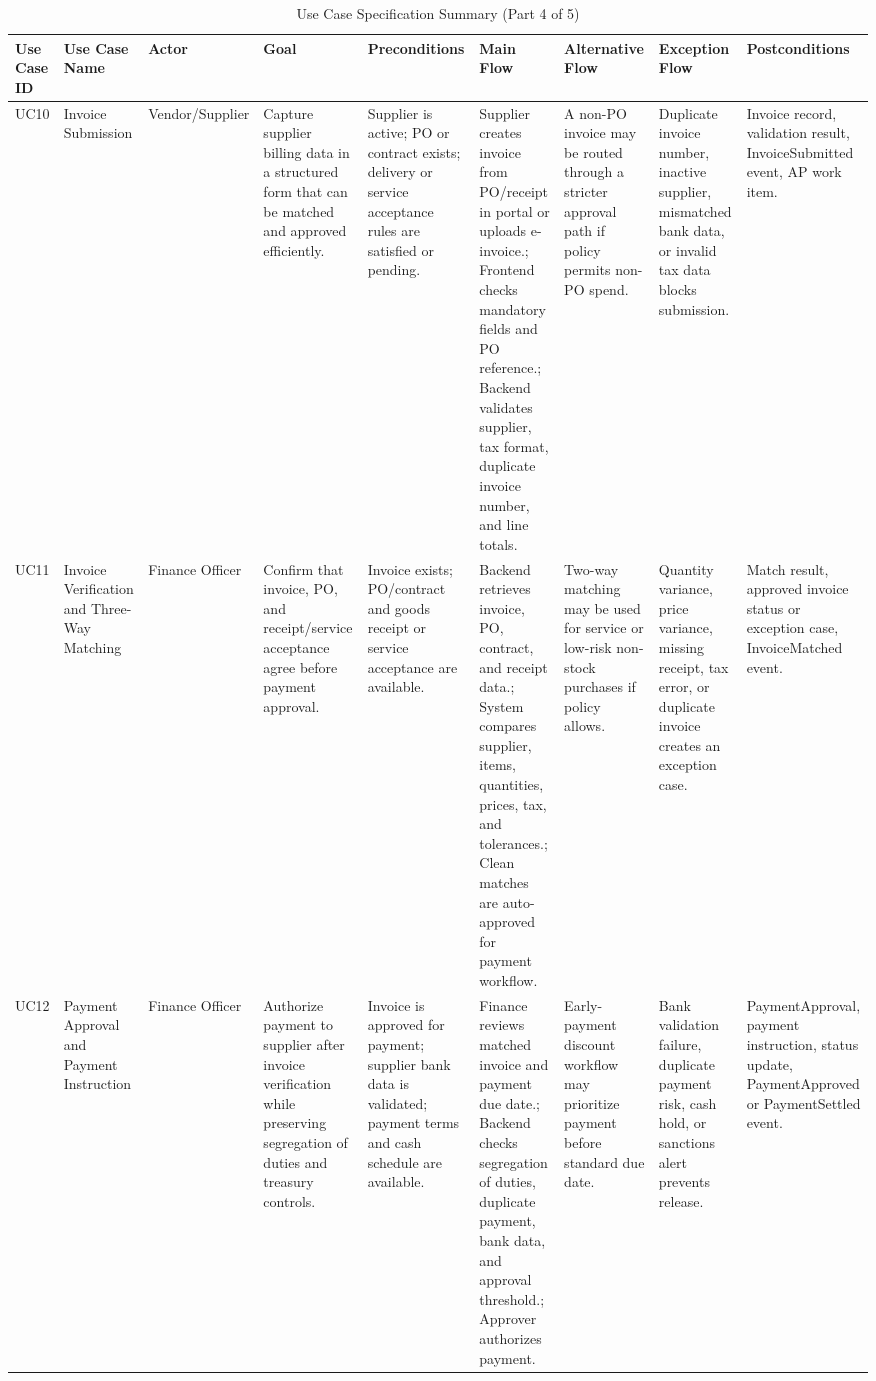 \documentclass[conference]{IEEEtran}
\begin{document}
\begin{table}[!t]
\caption{Use Case Specification Summary (Part 4 of 5)}
\label{tab:usecases-4}
\tiny
\begin{tabularx}{\textwidth}{|L{0.75cm}|L{1.8cm}|L{1.6cm}|Y|Y|Y|Y|Y|Y|}
\hline
\textbf{Use Case ID} & \textbf{Use Case Name} & \textbf{Actor} & \textbf{Goal} & \textbf{Preconditions} & \textbf{Main Flow} & \textbf{Alternative Flow} & \textbf{Exception Flow} & \textbf{Postconditions} \\ \hline
UC10 & Invoice Submission & Vendor/Supplier & Capture supplier billing data in a structured form that can be matched and approved efficiently. & Supplier is active; PO or contract exists; delivery or service acceptance rules are satisfied or pending. & Supplier creates invoice from PO/receipt in portal or uploads e-invoice.; Frontend checks mandatory fields and PO reference.; Backend validates supplier, tax format, duplicate invoice number, and line totals. & A non-PO invoice may be routed through a stricter approval path if policy permits non-PO spend. & Duplicate invoice number, inactive supplier, mismatched bank data, or invalid tax data blocks submission. & Invoice record, validation result, InvoiceSubmitted event, AP work item. \\ \hline
UC11 & Invoice Verification and Three-Way Matching & Finance Officer & Confirm that invoice, PO, and receipt/service acceptance agree before payment approval. & Invoice exists; PO/contract and goods receipt or service acceptance are available. & Backend retrieves invoice, PO, contract, and receipt data.; System compares supplier, items, quantities, prices, tax, and tolerances.; Clean matches are auto-approved for payment workflow. & Two-way matching may be used for service or low-risk non-stock purchases if policy allows. & Quantity variance, price variance, missing receipt, tax error, or duplicate invoice creates an exception case. & Match result, approved invoice status or exception case, InvoiceMatched event. \\ \hline
UC12 & Payment Approval and Payment Instruction & Finance Officer & Authorize payment to supplier after invoice verification while preserving segregation of duties and treasury controls. & Invoice is approved for payment; supplier bank data is validated; payment terms and cash schedule are available. & Finance reviews matched invoice and payment due date.; Backend checks segregation of duties, duplicate payment, bank data, and approval threshold.; Approver authorizes payment. & Early-payment discount workflow may prioritize payment before standard due date. & Bank validation failure, duplicate payment risk, cash hold, or sanctions alert prevents release. & PaymentApproval, payment instruction, status update, PaymentApproved or PaymentSettled event. \\ \hline
\end{tabularx}
\end{table}
\end{document}
